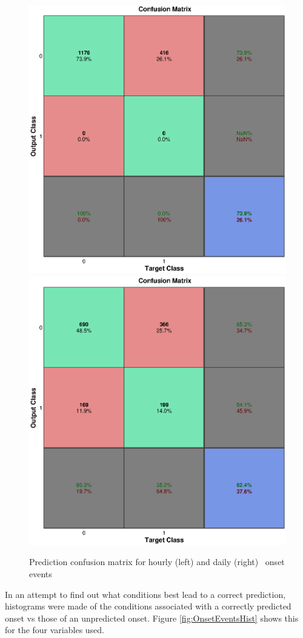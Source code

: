 \begin{figure}[htp!]
	\centering
	\includegraphics[width=0.45\linewidth]{Figures/CH5/NNBinaryOnset-hourly.eps}
	\includegraphics[width=0.45\linewidth]{Figures/CH5/NNBinaryOnset-daily.eps}
	\caption{Prediction confusion matrix for hourly (left) and daily (right) \req\ onset events}
	\label{fig:OnsetEvents}
\end{figure}

In an attempt to find out what conditions best lead to a correct prediction, histograms were made of the conditions associated with a correctly predicted onset vs those of an unpredicted onset. Figure \ref{fig:OnsetEventsHist} shows this for the four variables used.

